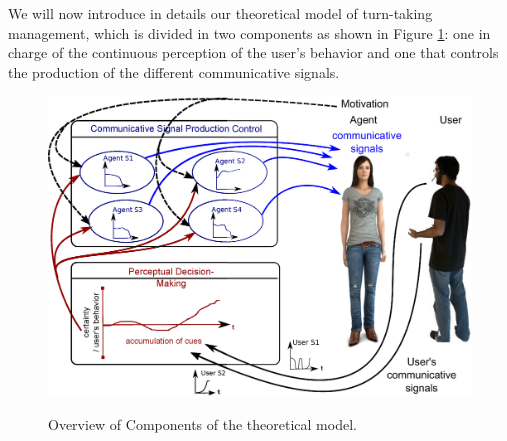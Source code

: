 We will now introduce in details our theoretical model of turn-taking management, which is divided in two components as shown in Figure \ref{mod_conc}: one in charge of the continuous perception of the user's behavior and one that controls the production of the different communicative signals. 

\begin{figure}
  \includegraphics[width=\linewidth]{figure/modele_conceptuel_act.eps}
  \label{mod_conc}
  \caption{Overview of Components of the theoretical model.}
\end{figure}



